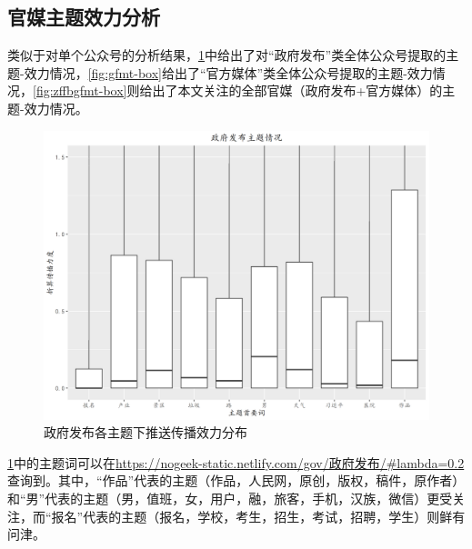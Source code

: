 \documentclass[a4paper,12pt,UTF8]{article}
\begin{document}
    \subsection{官媒主题效力分析}
    类似于对单个公众号的分析结果，\cref{fig:zffb-box}中给出了对“政府发布”类全体公众号提取的主题-效力情况，\cref{fig:gfmt-box}给出了“官方媒体”类全体公众号提取的主题-效力情况，\cref{fig:zffbgfmt-box}则给出了本文关注的全部官媒（政府发布+官方媒体）的主题-效力情况。
    \begin{figure}[htbp]
      \centering
      \includegraphics[width=0.9\linewidth]{政府发布.png}
      \caption{政府发布各主题下推送传播效力分布}
      \label{fig:zffb-box}
    \end{figure}
    \cref{fig:zffb-box}中的主题词可以在\url{https://nogeek-static.netlify.com/gov/政府发布/#lambda=0.2}查询到。其中，“作品”代表的主题（作品，人民网，原创，版权，稿件，原作者）和“男”代表的主题（男，值班，女，用户，融，旅客，手机，汉族，微信）更受关注，而“报名”代表的主题（报名，学校，考生，招生，考试，招聘，学生）则鲜有问津。
\end{document}

